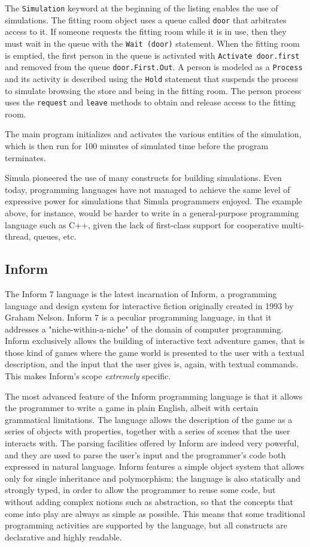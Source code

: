 The \texttt{Simulation} keyword at the beginning of the listing enables the use of simulations. The fitting room object uses a queue called \texttt{door} that arbitrates access to it. If someone requests the fitting room while it is in use, then they must wait in the queue with the \texttt{Wait (door)} statement. When the fitting room is emptied, the first person in the queue is activated with \texttt{Activate door.first} and removed from the queue \texttt{door.First.Out}. A person is modeled as a \texttt{Process} and its activity is described using the \texttt{Hold} statement that suspends the process to simulate browsing the store and being in the fitting room. The person process uses the \texttt{request} and \texttt{leave} methods to obtain and release access to the fitting room.

The main program initializes and activates the various entities of the simulation, which is then run for 100 minutes of simulated time before the program terminates.

Simula pioneered the use of many constructs for building simulations. Even today, programming languages have not managed to achieve the same level of expressive power for simulations that Simula programmers enjoyed. The example above, for instance, would be harder to write in a general-purpose programming language such as C++, given the lack of first-class support for cooperative multi-thread, queues, etc.


\subsection{Inform}
The Inform 7 language is the latest incarnation of Inform, a programming language and design system for interactive fiction originally created in 1993 by Graham Nelson. Inform 7 is a peculiar programming language, in that it addresses a "niche-within-a-niche" of the domain of computer programming. Inform exclusively allows the building of interactive text adventure games, that is those kind of games where the game world is presented to the user with a textual description, and the input that the user gives is, again, with textual commands. This makes Inform's scope \textit{extremely} specific.

The most advanced feature of the Inform programming language is that it allows the programmer to write a game in plain English, albeit with certain grammatical limitations. The language allows the description of the game as a series of objects with properties, together with a series of scenes that the user interacts with. The parsing facilities offered by Inform are indeed very powerful, and they are used to parse the user's input and the programmer's code both expressed in natural language. Inform features a simple object system that allows only for single inheritance and polymorphism; the language is also statically and strongly typed, in order to allow the programmer to reuse some code, but without adding complex notions such as abstraction, so that the concepts that come into play are always as simple as possible. This means that some traditional programming activities are supported by the language, but all constructs are declarative and highly readable.

